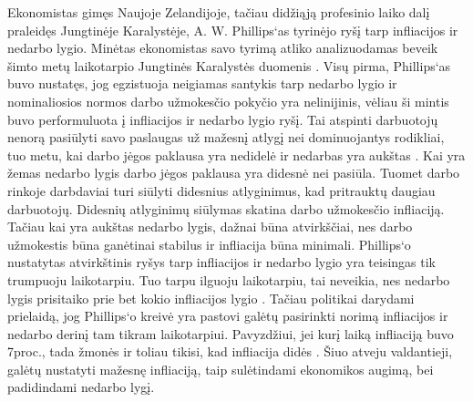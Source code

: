 \documentclass[11pt, titlepage]{article}
\begin{document}
Ekonomistas gimęs Naujoje Zelandijoje, tačiau didžiąją profesinio laiko dalį praleidęs Jungtinėje Karalystėje, A. W. Phillips‘as tyrinėjo ryšį tarp infliacijos ir nedarbo lygio.  Minėtas ekonomistas savo tyrimą atliko analizuodamas beveik šimto metų laikotarpio Jungtinės Karalystės duomenis \cite{lacker2007inflation}. Visų pirma, Phillips‘as buvo nustatęs, jog egzistuoja neigiamas santykis tarp nedarbo lygio ir nominaliosios normos darbo užmokesčio pokyčio yra nelinijinis, vėliau ši mintis buvo performuluota į infliacijos ir nedarbo lygio ryšį. Tai atspinti darbuotojų nenorą pasiūlyti savo paslaugas už mažesnį atlygį nei dominuojantys rodikliai, tuo metu, kai darbo jėgos paklausa yra nedidelė ir nedarbas yra aukštas \cite{gordon2008history}. Kai yra žemas nedarbo lygis darbo jėgos paklausa yra didesnė nei pasiūla. Tuomet darbo rinkoje darbdaviai turi siūlyti didesnius atlyginimus, kad pritrauktų daugiau darbuotojų. Didesnių atlyginimų siūlymas skatina darbo užmokesčio infliaciją. Tačiau kai yra aukštas nedarbo lygis, dažnai būna atvirkščiai, nes darbo užmokestis būna ganėtinai stabilus ir infliacija būna minimali. Phillips‘o nustatytas atvirkštinis ryšys tarp infliacijos ir nedarbo lygio yra teisingas tik trumpuoju laikotarpiu. Tuo tarpu ilguoju laikotarpiu, tai neveikia, nes nedarbo lygis prisitaiko prie bet kokio infliacijos lygio \cite{picardo_2019}.  Tačiau politikai darydami prielaidą, jog Phillips‘o kreivė yra pastovi galėtų pasirinkti norimą infliacijos ir nedarbo derinį tam tikram laikotarpiui. Pavyzdžiui, jei kurį laiką infliaciją buvo 7proc., tada žmonės ir toliau tikisi, kad infliacija didės \cite{vaitkute2009infliacijos}. Šiuo atveju valdantieji, galėtų nustatyti mažesnę infliaciją, taip sulėtindami ekonomikos augimą, bei padidindami nedarbo lygį.
\end{document}
